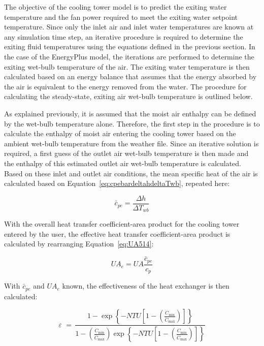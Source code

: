 The objective of the cooling tower model is to predict the exiting water temperature and the fan power required to meet the exiting water setpoint temperature. Since only the inlet air and inlet water temperatures are known at any simulation time step, an iterative procedure is required to determine the exiting fluid temperatures using the equations defined in the previous section. In the case of the EnergyPlus model, the iterations are performed to determine the exiting wet-bulb temperature of the air. The exiting water temperature is then calculated based on an energy balance that assumes that the energy absorbed by the air is equivalent to the energy removed from the water. The procedure for calculating the steady-state, exiting air wet-bulb temperature is outlined below.

As explained previously, it is assumed that the moist air enthalpy can be defined by the wet-bulb temperature alone. Therefore, the first step in the procedure is to calculate the enthalpy of moist air entering the cooling tower based on the ambient wet-bulb temperature from the weather file. Since an iterative solution is required, a first guess of the outlet air wet-bulb temperature is then made and the enthalpy of this estimated outlet air wet-bulb temperature is calculated. Based on these inlet and outlet air conditions, the mean specific heat of the air is calculated based on Equation~\ref{eq:cpebardeltahdeltaTwb}, repeated here:

\begin{equation}
\bar c_{pe} = \frac{{\Delta h}}{{\Delta T_{wb}}}
\end{equation}

With the overall heat transfer coefficient-area product for the cooling tower entered by the user, the effective heat transfer coefficient-area product is calculated by rearranging Equation~\ref{eq:UA514}:

\begin{equation}
UA_e = UA\frac{{\bar c_{pe}}}{{c_p}}
\end{equation}

With \(\bar c_{pe}\) and \(UA_e\) known, the effectiveness of the heat exchanger is then calculated:

\begin{equation}
\varepsilon \,\, = \,\frac{{1 - \exp \left\{ { - NTU\left[ {1 - \left( {\frac{{{{\dot C}_{\min }}}}{{{{\dot C}_{\max }}}}} \right)} \right]} \right\}}}{{1 - \left( {\frac{{{{\dot C}_{\min }}}}{{{{\dot C}_{\max }}}}} \right)\exp \left\{ { - NTU\left[ {1 - \left( {\frac{{{{\dot C}_{\min }}}}{{{{\dot C}_{\max }}}}} \right)} \right]} \right\}}}
\end{equation}

